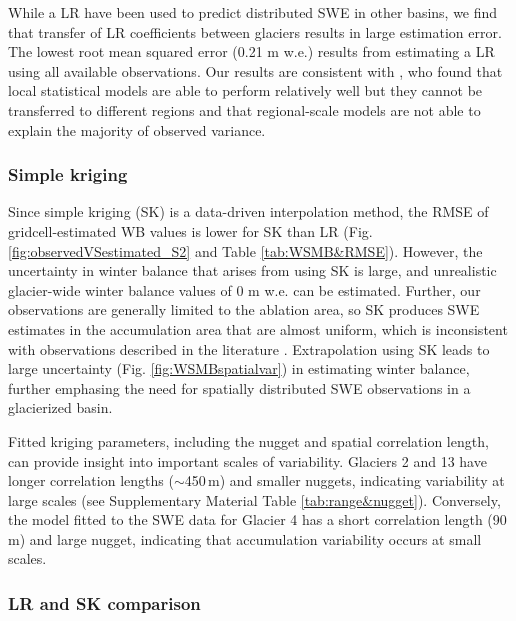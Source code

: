 \documentclass[twocolumn, letterpaper]{igs}
\begin{document}
While a LR have been used to predict distributed SWE in other basins, we find that transfer of LR coefficients between glaciers results in large estimation error. The lowest root mean squared error (0.21 m w.e.) results from estimating a LR using all available observations. Our results are consistent with \cite{Grunewald2013}, who found that local statistical models are able to perform relatively well but they cannot be transferred to different regions and that regional-scale models are not able to explain the majority of observed variance. 

\subsubsection{Simple kriging}

Since simple kriging (SK) is a data-driven interpolation method, the RMSE of gridcell-estimated WB values is lower for SK than LR (Fig. \ref{fig:observedVSestimated_S2} and Table \ref{tab:WSMB&RMSE}). However, the uncertainty in winter balance that arises from using SK is large, and unrealistic glacier-wide winter balance values of 0 m w.e. can be estimated. Further, our observations are generally limited to the ablation area, so SK produces SWE estimates in the accumulation area that are almost uniform, which is inconsistent with observations described in the literature \citep[e.g.][]{Machguth2006, Grabiec2011}. Extrapolation using SK leads to large uncertainty (Fig. \ref{fig:WSMBspatialvar}) in estimating winter balance, further emphasing the need for spatially distributed SWE observations in a glacierized basin.

Fitted kriging parameters, including the nugget and spatial correlation length, can provide insight into important scales of variability. Glaciers 2 and 13 have longer correlation lengths ($\sim$450\,m) and smaller nuggets, indicating variability at large scales (see Supplementary Material Table \ref{tab:range&nugget}). Conversely, the model fitted to the SWE data for Glacier 4 has a short correlation length (90 m) and large nugget, indicating that accumulation variability occurs at small scales. 

\subsubsection{LR and SK comparison}
 
\end{document}
